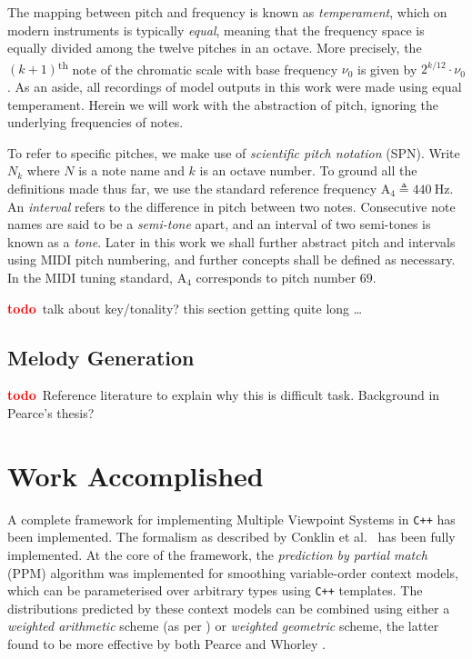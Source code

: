 \documentclass[12pt,a4paper,twoside,openright]{report}
\newcommand{\todo}{\textcolor{red}{\textbf{todo}~}}
\begin{document}
The mapping between pitch and frequency is known as \emph{temperament}, which on
modern instruments is typically \emph{equal}, meaning that the frequency space is
equally divided among the twelve pitches in an octave. More precisely, the
$(k+1)$\textsuperscript{th} note of the chromatic scale with base frequency $\nu_0$ is
given by $2^{k/12}\cdot\nu_0$. As an aside, all recordings of
model outputs in this work were made using equal temperament. Herein
we will work with the abstraction of pitch, ignoring the underlying frequencies
of notes.

To refer to specific pitches, we make use of \emph{scientific pitch notation}
(SPN). Write $N_k$ where $N$ is a note name and $k$ is an octave number. To
ground all the definitions made thus far, we use the standard reference
frequency $\mathrm{A}_4 \triangleq 440\ \mathrm{Hz}$. An \emph{interval} refers
to the difference in pitch between two notes. Consecutive note names are said to
be a \emph{semi-tone} apart, and an interval of two semi-tones is known as a
\emph{tone}. Later in this work we shall further abstract pitch and intervals
using MIDI pitch numbering, and further concepts shall be defined as necessary.
In the MIDI tuning standard, $\mathrm{A}_4$ corresponds to pitch number $69$.

\todo talk about key/tonality? this section getting quite long \ldots

\subsection{Melody Generation}

\todo Reference literature to explain why this is difficult task. Background in
Pearce's thesis?

\section{Work Accomplished}

A complete framework for implementing Multiple Viewpoint Systems in \verb!C++!
has been implemented. The formalism as described by Conklin et al.\
\cite{conklin1995viewpoints} has been fully implemented.  At the core of the
framework, the \emph{prediction by partial match} (PPM) algorithm
\cite{cleary1984ppm} was implemented for smoothing variable-order context
models, which can be parameterised over arbitrary types using \verb!C++!
templates. The distributions predicted by these context models can be combined
using either a \emph{weighted arithmetic} scheme (as per
\cite{conklin1995viewpoints}) or \emph{weighted geometric} scheme, the latter
found to be more effective by both Pearce \cite{pearce2005construction} and
Whorley \cite{whorley2013phd}.
\end{document}
